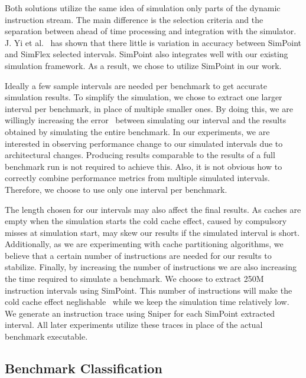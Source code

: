 Both solutions utilize the same idea of simulation only parts of the dynamic instruction stream.
The main difference is the selection criteria and the separation between ahead of time processing and integration with the simulator.
J. Yi et al.~\cite{Yi2005} has shown that there little is variation in accuracy between SimPoint and SimFlex selected intervals.
SimPoint also integrates well with our existing simulation framework.
As a result, we chose to utilize SimPoint in our work.

Ideally a few sample intervals are needed per benchmark to get accurate simulation results.
To simplify the simulation, we chose to extract one larger interval per benchmark, in place of multiple smaller ones.
By doing this, we are willingly increasing the error~\cite{Hamerly2004} between simulating our interval and the results obtained by simulating the entire benchmark.
In our experiments, we are interested in observing performance change to our simulated intervals due to architectural changes.
Producing results comparable to the results of a full benchmark run is not required to achieve this.
Also, it is not obvious how to correctly combine performance metrics from multiple simulated intervals.
Therefore, we choose to use only one interval per benchmark.

The length chosen for our intervals may also affect the final results.
As caches are empty when the simulation starts the cold cache effect, caused by compulsory misses at simulation start, may skew our results if the simulated interval is short.
Additionally, as we are experimenting with cache partitioning algorithms, we believe that a certain number of instructions are needed for our results to stabilize.
Finally, by increasing the number of instructions we are also increasing the time required to simulate a benchmark.
We choose to extract 250M instruction intervals using SimPoint.
This number of instructions will make the cold cache effect neglishable~\cite{Hamerly2005,Hamerly2004,Olsen2014} while we keep the simulation time relatively low.
We generate an instruction trace using Sniper for each SimPoint extracted interval.
All later experiments utilize these traces in place of the actual benchmark executable.

\subsection{Benchmark Classification}
\label{sec:methodology:benchmarks:classification}


